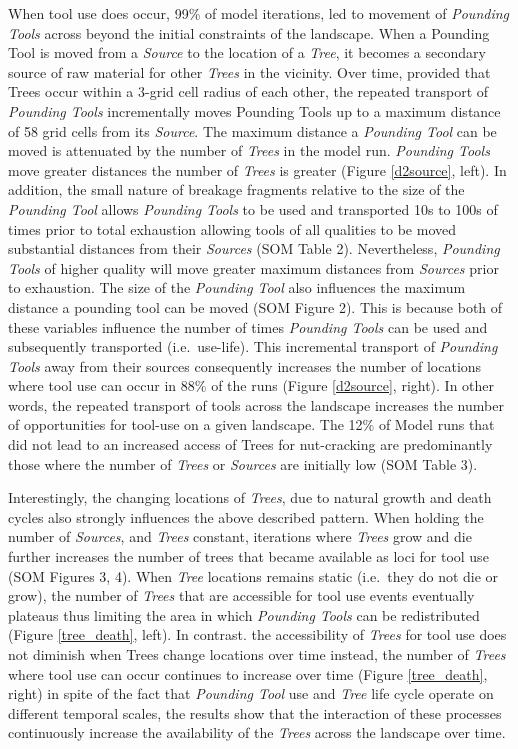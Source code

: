 \documentclass[9pt,twocolumn,twoside,]{pnas-new}
\begin{document}
When tool use does occur, 99\% of model iterations, led to movement of
\emph{Pounding Tools} across beyond the initial constraints of the
landscape. When a Pounding Tool is moved from a \emph{Source} to the
location of a \emph{Tree}, it becomes a secondary source of raw material
for other \emph{Trees} in the vicinity. Over time, provided that Trees
occur within a 3-grid cell radius of each other, the repeated transport
of \emph{Pounding Tools} incrementally moves Pounding Tools up to a
maximum distance of 58 grid cells from its \emph{Source}. The maximum
distance a \emph{Pounding Tool} can be moved is attenuated by the number
of \emph{Trees} in the model run. \emph{Pounding Tools} move greater
distances the number of \emph{Trees} is greater (Figure \ref{d2source},
left). In addition, the small nature of breakage fragments relative to
the size of the \emph{Pounding Tool} allows \emph{Pounding Tools} to be
used and transported 10s to 100s of times prior to total exhaustion
allowing tools of all qualities to be moved substantial distances from
their \emph{Sources} (SOM Table 2). Nevertheless, \emph{Pounding Tools}
of higher quality will move greater maximum distances from
\emph{Sources} prior to exhaustion. The size of the \emph{Pounding Tool}
also influences the maximum distance a pounding tool can be moved (SOM
Figure 2). This is because both of these variables influence the number
of times \emph{Pounding Tools} can be used and subsequently transported
(i.e.~use-life). This incremental transport of \emph{Pounding Tools}
away from their sources consequently increases the number of locations
where tool use can occur in 88\% of the runs (Figure \ref{d2source},
right). In other words, the repeated transport of tools across the
landscape increases the number of opportunities for tool-use on a given
landscape. The 12\% of Model runs that did not lead to an increased
access of Trees for nut-cracking are predominantly those where the
number of \emph{Trees} or \emph{Sources} are initially low (SOM Table
3).

Interestingly, the changing locations of \emph{Trees}, due to natural
growth and death cycles also strongly influences the above described
pattern. When holding the number of \emph{Sources}, and \emph{Trees}
constant, iterations where \emph{Trees} grow and die further increases
the number of trees that became available as loci for tool use (SOM
Figures 3, 4). When \emph{Tree} locations remains static (i.e.~they do
not die or grow), the number of \emph{Trees} that are accessible for
tool use events eventually plateaus thus limiting the area in which
\emph{Pounding Tools} can be redistributed (Figure \ref{tree_death},
left). In contrast. the accessibility of \emph{Trees} for tool use does
not diminish when Trees change locations over time instead, the number
of \emph{Trees} where tool use can occur continues to increase over time
(Figure \ref{tree_death}, right) in spite of the fact that
\emph{Pounding Tool} use and \emph{Tree} life cycle operate on different
temporal scales, the results show that the interaction of these
processes continuously increase the availability of the \emph{Trees}
across the landscape over time.
\end{document}
